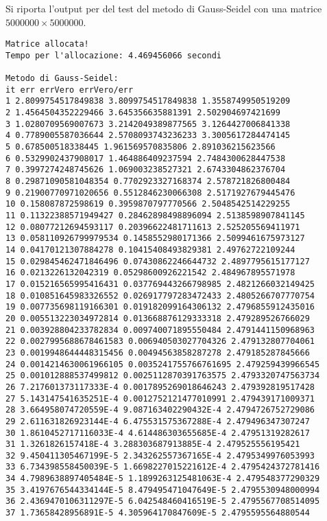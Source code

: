 \documentclass[12pt]{article}
\begin{document}
\newpage
Si riporta l'output per del test del metodo di Gauss-Seidel con una matrice \(5000000\times5000000\).
\begin{verbatim}
Matrice allocata!
Tempo per l'allocazione: 4.469456066 secondi

Metodo di Gauss-Seidel: 
it err errVero errVero/err
1 2.8099754517849838 3.8099754517849838 1.3558749950519209
2 1.4564504352229466 3.645356635881391 2.502904697421699
3 1.0280709569007673 3.2142049389877565 3.1264427006841338
4 0.7789005587036644 2.5708093743236233 3.3005617284474145
5 0.678500518338445 1.961569570835806 2.891036215623566
6 0.5329902437908017 1.464886409237594 2.7484300628447538
7 0.3997274248745626 1.069003238527321 2.6743304862376704
8 0.29871090581048354 0.7702923327168374 2.578721826800484
9 0.21900770971020656 0.5512846230066308 2.5171927679445476
10 0.158087872598619 0.3959870797770566 2.5048542514229255
11 0.11322388571949427 0.28462898498896094 2.5138598907841145
12 0.08077212694593117 0.20396622481711613 2.525205569411971
13 0.058110926799979534 0.1458552980171366 2.5099461675973127
14 0.04170121307884278 0.10415408493829381 2.49762722109244
15 0.029845462471846496 0.07430862246644732 2.4897795615177127
16 0.0213226132042319 0.05298600926221542 2.484967895571978
17 0.015216565995416431 0.037769443266798985 2.4821266032149425
18 0.010851645983326552 0.026917797283472433 2.4805266707770754
19 0.007735698119166301 0.019182099164306132 2.4796855912435016
20 0.005513223034972814 0.013668876129333318 2.479289526766029
21 0.003928804233782834 0.009740071895550484 2.4791441150968963
22 0.0027995688678461583 0.006940503027704326 2.479132807704061
23 0.0019948644448315456 0.00494563858287278 2.479185287845666
24 0.0014214630061966105 0.0035241755766761695 2.479259439966545
25 0.001012888537499812 0.0025112870391763575 2.4793320747563734
26 7.217601373117333E-4 0.0017895269018646243 2.479392819517428
27 5.143147541635251E-4 0.0012752121477010991 2.479439171009371
28 3.664958074720559E-4 9.087163402290432E-4 2.4794726752729086
29 2.611631826923144E-4 6.475531575367288E-4 2.479496347307247
30 1.8610452717116033E-4 4.614486303655685E-4 2.47951319282617
31 1.3261826157418E-4 3.288303687913885E-4 2.479525556195421
32 9.450411305467199E-5 2.343262557367165E-4 2.4795349976053993
33 6.734398558450039E-5 1.6698227015221612E-4 2.4795424372781416
34 4.7989638897405484E-5 1.1899263125481063E-4 2.479548377290329
35 3.4197676544334144E-5 8.479495471047649E-5 2.4795530948000994
36 2.4369470106311297E-5 6.042548460416519E-5 2.4795567708514095
37 1.73658428956891E-5 4.305964170847609E-5 2.4795595564880544

\end{verbatim}
\end{document}
